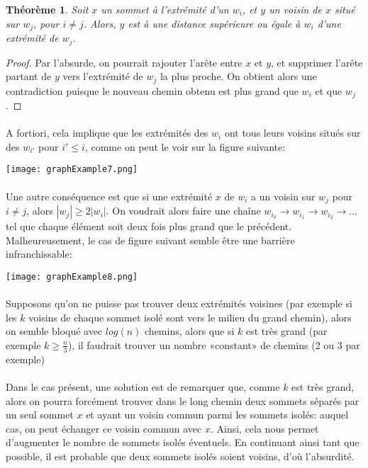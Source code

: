\documentclass[a4paper]{article}
\newtheorem{theorem}{Théorème}
\theoremstyle{definition}
\theoremstyle{remark}
\begin{document}
\begin{theorem}
Soit $x$ un sommet à l'extrémité d'un $w_{i}$, et $y$ un voisin de $x$
situé sur $w_{j}$, pour $i \neq j$. Alors, $y$ est à une distance supérieure ou égale à $w_{i}$ d'une extrémité de $w_{j}$.
\end{theorem}

\begin{proof}
Par l'absurde, on pourrait rajouter l'arête entre $x$ et $y$, et
supprimer l'arête partant de $y$ vers l'extrémité de $w_{j}$ la plus
proche. On obtient alors une contradiction puisque le nouveau chemin obtenu est plus grand que $w_{i}$ et que $w_{j}$.
\end{proof}


\paragraph{}
A fortiori, cela implique que les extrémités des $w_{i}$ ont tous leurs
voisins situés sur des $w_{i'}$ pour $i' \leq i$, comme on peut le voir 
sur la figure suivante:

\texttt{[image: graphExample7.png]}

\paragraph{}
Une autre conséquence est que si une extrémité $x$ de $w_{i}$ a un voisin sur $w_{j}$ pour $i \neq j$, alors $|w_{j}| \geq 2|w_{i}|$. On 
voudrait alors faire une chaîne $w_{i_{0}} \rightarrow w_{i_{1}} \rightarrow w_{i_{2}} \rightarrow ...$ tel que chaque élément soit deux 
fois plus grand que le précédent. Malheureusement, le cas de figure 
suivant semble être une barrière infranchissable:

\texttt{[image: graphExample8.png]}

\paragraph{}
Supposons qu'on ne puisse pas trouver deux extrémités voisines (par exemple si les $k$ voisins de chaque sommet isolé sont vers le milieu du 
grand chemin), alors on semble bloqué avec $log(n)$ chemins, alors que si $k$ est très grand (par exemple $k \geq \frac{n}{3}$), il faudrait trouver un nombre «constant» de chemins (2 ou 3 par exemple)

\paragraph{}
Dans le cas présent, une solution est de remarquer que, comme $k$ est 
très grand, alors on pourra forcément trouver dans le long chemin deux 
sommets séparés par un seul sommet $x$ et ayant un voisin commun parmi les sommets isolés: auquel cas, on peut échanger ce voisin commun avec $x$. Ainsi, cela nous permet d'augmenter le nombre de sommets isolés 
éventuels. En continuant ainsi tant que possible, il est probable que 
deux sommets isolés soient voisins, d'où l'absurdité.
\end{document}
